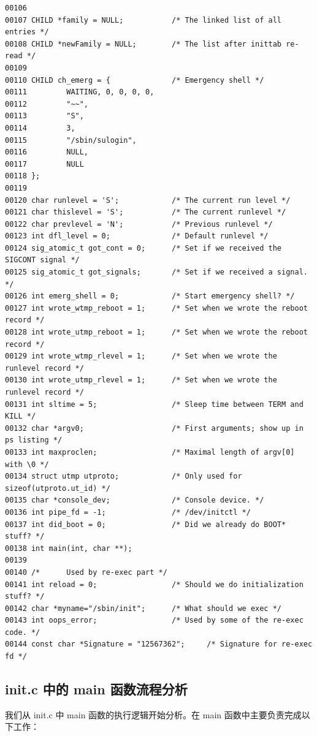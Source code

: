 {\begin{shaded}\begin{verbatim}
00106 
00107 CHILD *family = NULL;           /* The linked list of all entries */
00108 CHILD *newFamily = NULL;        /* The list after inittab re-read */
00109 
00110 CHILD ch_emerg = {              /* Emergency shell */
00111         WAITING, 0, 0, 0, 0,
00112         "~~",
00113         "S",
00114         3,
00115         "/sbin/sulogin",
00116         NULL,
00117         NULL
00118 };
00119 
00120 char runlevel = 'S';            /* The current run level */
00121 char thislevel = 'S';           /* The current runlevel */
00122 char prevlevel = 'N';           /* Previous runlevel */
00123 int dfl_level = 0;              /* Default runlevel */
00124 sig_atomic_t got_cont = 0;      /* Set if we received the SIGCONT signal */
00125 sig_atomic_t got_signals;       /* Set if we received a signal. */
00126 int emerg_shell = 0;            /* Start emergency shell? */
00127 int wrote_wtmp_reboot = 1;      /* Set when we wrote the reboot record */
00128 int wrote_utmp_reboot = 1;      /* Set when we wrote the reboot record */
00129 int wrote_wtmp_rlevel = 1;      /* Set when we wrote the runlevel record */
00130 int wrote_utmp_rlevel = 1;      /* Set when we wrote the runlevel record */
00131 int sltime = 5;                 /* Sleep time between TERM and KILL */
00132 char *argv0;                    /* First arguments; show up in ps listing */
00133 int maxproclen;                 /* Maximal length of argv[0] with \0 */
00134 struct utmp utproto;            /* Only used for sizeof(utproto.ut_id) */
00135 char *console_dev;              /* Console device. */
00136 int pipe_fd = -1;               /* /dev/initctl */
00137 int did_boot = 0;               /* Did we already do BOOT* stuff? */
00138 int main(int, char **);
00139 
00140 /*      Used by re-exec part */
00141 int reload = 0;                 /* Should we do initialization stuff? */
00142 char *myname="/sbin/init";      /* What should we exec */
00143 int oops_error;                 /* Used by some of the re-exec code. */
00144 const char *Signature = "12567362";     /* Signature for re-exec fd */
\end{verbatim}\end{shaded}}
\subsection{init.c 中的 main 函数流程分析}

我们从 init.c 中 main 函数的执行逻辑开始分析。在 main
函数中主要负责完成以下工作：

